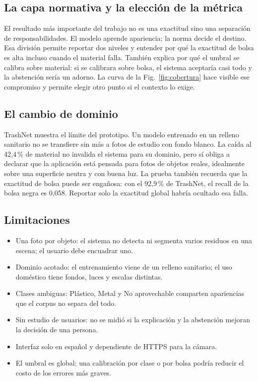 \documentclass[10pt]{ieeeconf}
\begin{document}
\subsection{La capa normativa y la elecci\'on de la m\'etrica}

El resultado m\'as importante del trabajo no es una exactitud sino una separaci\'on
de responsabilidades. El modelo aprende apariencia; la norma decide el destino. Esa
divisi\'on permite reportar dos niveles y entender por qu\'e la exactitud de bolsa
es alta incluso cuando el material falla. Tambi\'en explica por qu\'e el umbral se
calibra sobre material: si se calibrara sobre bolsa, el sistema aceptar\'ia casi
todo y la abstenci\'on ser\'ia un adorno. La curva de la Fig.~\ref{fig:cobertura}
hace visible ese compromiso y permite elegir otro punto si el contexto lo exige.

\subsection{El cambio de dominio}

TrashNet muestra el l\'imite del prototipo. Un modelo entrenado en un relleno
sanitario no se transfiere sin m\'as a fotos de estudio con fondo blanco. La
ca\'ida al 42,4\,\% de material no invalida el sistema para su dominio, pero s\'i
obliga a declarar que la aplicaci\'on est\'a pensada para fotos de objetos reales,
idealmente sobre una superficie neutra y con buena luz. La prueba tambi\'en
recuerda que la exactitud de bolsa puede ser enga\~nosa: con el 92,9\,\% de
TrashNet, el recall de la bolsa negra es 0,058. Reportar solo la exactitud global
habr\'ia ocultado esa falla.

\subsection{Limitaciones}

\begin{itemize}
\item Una foto por objeto: el sistema no detecta ni segmenta varios residuos en
una escena; el usuario debe encuadrar uno.
\item Dominio acotado: el entrenamiento viene de un relleno sanitario; el uso
dom\'estico tiene fondos, luces y escalas distintas.
\item Clases ambiguas: Pl\'astico, Metal y No aprovechable comparten apariencias
que el corpus no separa del todo.
\item Sin estudio de usuarios: no se midi\'o si la explicaci\'on y la abstenci\'on
mejoran la decisi\'on de una persona.
\item Interfaz solo en espa\~nol y dependiente de HTTPS para la c\'amara.
\item El umbral es global; una calibraci\'on por clase o por bolsa podr\'ia
reducir el costo de los errores m\'as graves.
\end{itemize}
\end{document}

